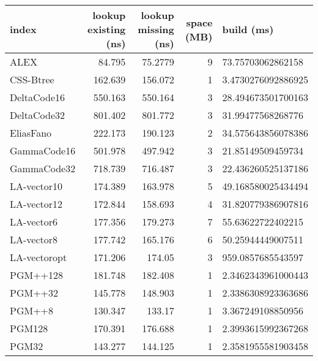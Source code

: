 \begin{tabular}{lrrrl}
\hline
 index             &   lookup existing (ns) &   lookup missing (ns) &   space (MB) & build (ms)         \\
\hline
 ALEX              &                84.795  &               75.2779 &            9 & 73.75703062862158  \\
 CSS-Btree         &               162.639  &              156.072  &            1 & 3.4730276092886925 \\
 DeltaCode16       &               550.163  &              550.164  &            3 & 28.494673501700163 \\
 DeltaCode32       &               801.402  &              801.772  &            3 & 31.99477568268776  \\
 EliasFano         &               222.173  &              190.123  &            2 & 34.575643856078386 \\
 GammaCode16       &               501.978  &              497.942  &            3 & 21.85149509459734  \\
 GammaCode32       &               718.739  &              716.487  &            3 & 22.436260525137186 \\
 LA-vector10       &               174.389  &              163.978  &            5 & 49.168580025434494 \\
 LA-vector12       &               172.844  &              158.693  &            4 & 31.820779386907816 \\
 LA-vector6        &               177.356  &              179.273  &            7 & 55.63622722402215  \\
 LA-vector8        &               177.742  &              165.176  &            6 & 50.25944449007511  \\
 LA-vectoropt      &               171.206  &              174.05   &            3 & 959.0857685543597  \\
 PGM++128          &               181.748  &              182.408  &            1 & 2.3462343961000443 \\
 PGM++32           &               145.778  &              148.903  &            1 & 2.3386308923363686 \\
 PGM++8            &               130.347  &              133.17   &            1 & 3.367249108850956  \\
 PGM128            &               170.391  &              176.688  &            1 & 2.3993615992367268 \\
 PGM32             &               143.277  &              144.125  &            1 & 2.3581955581903458 \\

\end{tabular}
